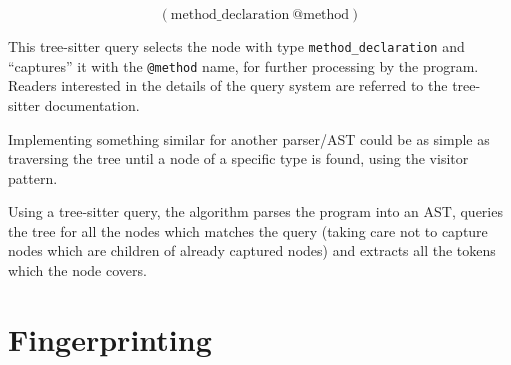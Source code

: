 \begin{equation}
    (\mathrm{method\_declaration\ } \text{@method})
\end{equation}

This tree-sitter query selects the node with type \verb|method_declaration| and
``captures'' it with the \verb|@method| name, for further processing by the program.
Readers interested in the details of the query system are referred to the tree-sitter
documentation\cite{treesitter}.

Implementing something similar for another parser/AST could be as simple as traversing
the tree until a node of a specific type is found, using the visitor pattern.

Using a tree-sitter query, the algorithm parses the program into an AST, queries the tree
for all the nodes which matches the query (taking care not to capture nodes which are
children of already captured nodes) and extracts all the tokens which the node covers.

\section{Fingerprinting}

